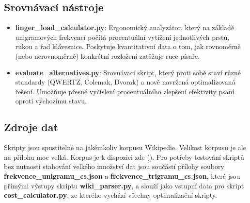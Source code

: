 \documentclass[a4paper, twoside, 12pt, czech]{article}
\begin{document}
\subsection*{Srovnávací nástroje}
\begin{itemize}
    \item \textbf{finger\_load\_calculator.py}: Ergonomický analyzátor, který na základě unigramových frekvencí počítá procentuální vytížení jednotlivých prstů, rukou a řad klávesnice. Poskytuje kvantitativní data o tom, jak rovnoměrně (nebo nerovnoměrně) konkrétní rozložení zatěžuje ruce písaře.
    \item \textbf{evaluate\_alternatives.py}: Srovnávací skript, který proti sobě staví různé standardy (QWERTZ, Colemak, Dvorak) a nově navržená optimalizovaná řešení. Umožňuje přesné vyčíslení procentuálního zlepšení efektivity psaní oproti výchozímu stavu.
\end{itemize}
\subsection*{Zdroje dat}
Skripty jsou spustitelné na jakémkoliv korpusu Wikipedie. Velikost korpusu je 
ale na přílohu moc velká. Korpus je k dispozici zde (\cite{wikidump}). Pro potřeby 
testování skriptů bez nutnosti stahování velkého množství dat jsou součástí přílohy 
soubory \textbf{frekvence\_unigramu\_cs.json} a \textbf{frekvence\_trigramu\_cs.json},
které jsou přímými výstupy skriptu \textbf{wiki\_parser.py}, a slouží jako vstupní 
data pro skript \textbf{cost\_calculator.py}, ze kterého vychází všechny optimalizační 
skripty.
\end{document}
